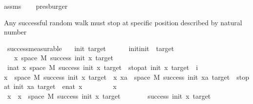 \begin{isabellebody}
assms\isanewline
\ \ \isamarkupfalse%
\ presburger%
\endisatagproof
{\isafoldproof}%
%
\isadelimproof
%
\endisadelimproof
%
\begin{isamarkuptext}%
Any successful random walk must stop at specific position described by natural number%
\end{isamarkuptext}\isamarkuptrue%
\isamarkupfalse%
\ success{\isacharunderscore}{\kern0pt}measurable{}{\isacharcolon}{\kern0pt}\isanewline
\ \ \ init\ target\ \isanewline
\ \ \ {\isachardoublequoteopen}{}\ {\isacharless}{\kern0pt}\ init{\isachardoublequoteclose}{\isachardoublequoteopen}init\ {\isacharless}{\kern0pt}\ target{\isachardoublequoteclose}\isanewline
\ \ \ {\isachardoublequoteopen}{\isacharbraceleft}{\kern0pt}x{\isasymin}\ space\ M{\isachardot}{\kern0pt}\ success\ init\ x\ target{\isacharbraceright}{\kern0pt}\ \isanewline
{\isacharequal}{\kern0pt}\ {\isacharparenleft}{\kern0pt}{\isasymUnion}i{\isacharcolon}{\kern0pt}{\isacharcolon}{\kern0pt}nat{\isachardot}{\kern0pt}\ {\isacharbraceleft}{\kern0pt}x{\isasymin}\ space\ M{\isachardot}{\kern0pt}\ success\ init\ x\ target\ {\isasymand}\ stop{\isacharunderscore}{\kern0pt}at\ init\ x\ target\ {\isacharequal}{\kern0pt}\ i{\isacharbraceright}{\kern0pt}{\isacharparenright}{\kern0pt}{\isachardoublequoteclose}\isanewline
%
\isadelimproof
%
\endisadelimproof
%
\isatagproof
{}\isamarkupfalse%
\isanewline
\ \ \isamarkupfalse%
{\isachardoublequoteopen}{\isacharbraceleft}{\kern0pt}x\ {\isasymin}\ space\ M{\isachardot}{\kern0pt}\ success\ init\ x\ target{\isacharbraceright}{\kern0pt}\ {\isasymsubseteq}\ {\isacharparenleft}{\kern0pt}{\isasymUnion}x{\isachardot}{\kern0pt}\ {\isacharbraceleft}{\kern0pt}xa\ {\isasymin}\ space\ M{\isachardot}{\kern0pt}\ success\ init\ xa\ target\ {\isasymand}\ stop{\isacharunderscore}{\kern0pt}at\ init\ xa\ target\ {\isacharequal}{\kern0pt}\ enat\ x{\isacharbraceright}{\kern0pt}{\isacharparenright}{\kern0pt}{\isachardoublequoteclose}\isanewline
\ \ \isamarkupfalse%
\isanewline
\ \ \ \ \isamarkupfalse%
\ x\isanewline
\ \ \ \ \isamarkupfalse%
\ {\isachardoublequoteopen}x\ {\isasymin}\ {\isacharbraceleft}{\kern0pt}x\ {\isasymin}\ space\ M{\isachardot}{\kern0pt}\ success\ init\ x\ target{\isacharbraceright}{\kern0pt}{\isachardoublequoteclose}\isanewline
\ \ \ \ \isamarkupfalse%
\ \isamarkupfalse%
\ {\isachardoublequoteopen}success\ init\ x\ target{\isachardoublequoteclose}\isanewline

\end{isabellebody}
